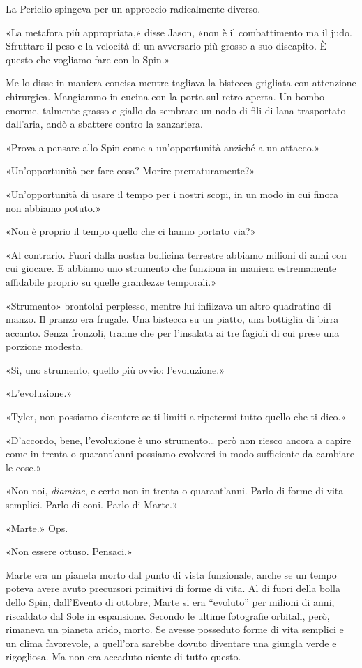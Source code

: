 La Perielio spingeva per un approccio radicalmente diverso.

«La metafora più appropriata,» disse Jason, «non è il combattimento ma
il judo. Sfruttare il peso e la velocità di un avversario più grosso a
suo discapito. È questo che vogliamo fare con lo Spin.»

Me lo disse in maniera concisa mentre tagliava la bistecca grigliata con
attenzione chirurgica. Mangiammo in cucina con la porta sul retro
aperta. Un bombo enorme, talmente grasso e giallo da sembrare un nodo di
fili di lana trasportato dall'aria, andò a sbattere contro la
zanzariera.

«Prova a pensare allo Spin come a un'opportunità anziché a un attacco.»

«Un'opportunità per fare cosa? Morire prematuramente?»

«Un'opportunità di usare il tempo per i nostri scopi, in un modo in cui
finora non abbiamo potuto.»

«Non è proprio il tempo quello che ci hanno portato via?»

«Al contrario. Fuori dalla nostra bollicina terrestre abbiamo milioni di
anni con cui giocare. E abbiamo uno strumento che funziona in maniera
estremamente affidabile proprio su quelle grandezze temporali.»

«Strumento» brontolai perplesso, mentre lui infilzava un altro
quadratino di manzo. Il pranzo era frugale. Una bistecca su un piatto,
una bottiglia di birra accanto. Senza fronzoli, tranne che per
l'insalata ai tre fagioli di cui prese una porzione modesta.

«Sì, uno strumento, quello più ovvio: l'evoluzione.»

«L'evoluzione.»

«Tyler, non possiamo discutere se ti limiti a ripetermi tutto quello che
ti dico.»

«D'accordo, bene, l'evoluzione è uno strumento\ldots{} però non riesco
ancora a capire come in trenta o quarant'anni possiamo evolverci in modo
sufficiente da cambiare le cose.»

«Non noi, \emph{diamine}, e certo non in trenta o quarant'anni. Parlo di
forme di vita semplici. Parlo di eoni. Parlo di Marte.»

«Marte.» Ops.

«Non essere ottuso. Pensaci.»

Marte era un pianeta morto dal punto di vista funzionale, anche se un
tempo poteva avere avuto precursori primitivi di forme di vita. Al di
fuori della bolla dello Spin, dall'Evento di ottobre, Marte si era
``evoluto'' per milioni di anni, riscaldato dal Sole in espansione.
Secondo le ultime fotografie orbitali, però, rimaneva un pianeta arido,
morto. Se avesse posseduto forme di vita semplici e un clima favorevole,
a quell'ora sarebbe dovuto diventare una giungla verde e rigogliosa. Ma
non era accaduto niente di tutto questo.

